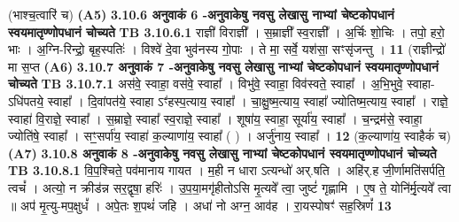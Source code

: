 \documentclass[17pt]{extarticle}
\begin{document}
{{{{{{{{{{{{{{{{{{{{{{                  \newline
                                    (भाश्च॒त्वारि॑ च) \textbf{(A5)} \newline \newline
                \textbf{ 3.10.6    अनुवाकं   6 -अनुवाकेषु नवसु लेखासु नाभ्यां चेष्टकोपधानं स्वयमातृण्णोपधानं चोच्यते} \newline
                                \textbf{ TB 3.10.6.1} \newline
                  राज्ञी॑ विराज्ञी᳚ । स॒म्राज्ञी᳚ स्व॒राज्ञी᳚ । अ॒र्चिः शो॒चिः । तपो॒ हरो॒ भाः । अ॒ग्नि-रिन्द्रो॒ बृह॒स्पतिः॑ । विश्वे॑ दे॒वा भुव॑नस्य गो॒पाः । ते मा॒ सर्वे॒ यश॑सा॒ सꣳसृ॑जन्तु । \textbf{ 11} \newline
                  \newline
                                    (राज्ञीन्द्रो॑ मा स॒प्त \textbf{(A6)} \newline \newline
                \textbf{ 3.10.7    अनुवाकं   7 -अनुवाकेषु नवसु लेखासु नाभ्यां चेष्टकोपधानं स्वयमातृण्णोपधानं चोच्यते} \newline
                                \textbf{ TB 3.10.7.1} \newline
                  अस॑वे॒ स्वाहा॒ वस॑वे॒ स्वाहा᳚ । विभु॑वे॒ स्वाहा॒ विव॑स्वते॒ स्वाहा᳚ । अ॒भि॒भुवे॒ स्वाहा-ऽधि॑पतये॒ स्वाहा᳚ । दि॒वांपत॑ये॒ स्वाहा ऽꣳ॑हस्प॒त्याय॒ स्वाहा᳚ । चा॒क्षु॒ष्म॒त्याय॒ स्वाहा᳚ ज्योतिष्म॒त्याय॒ स्वाहा᳚ । राज्ञे॒ स्वाहा॑ वि॒राज्ञे॒ स्वाहा᳚ । स॒म्राज्ञे॒ स्वाहा᳚ स्व॒राज्ञे॒ स्वाहा᳚ । शूषा॑य॒ स्वाहा॒ सूर्या॑य॒ स्वाहा᳚ । च॒न्द्रम॑से॒ स्वाहा॒ ज्योति॑षे॒ स्वाहा᳚ । सꣳ॒॒सर्पा॑य॒ स्वाहा॑ क॒ल्याणा॑य॒ स्वाहा᳚ ( ) । अर्जु॑नाय॒ स्वाहा᳚ । \textbf{ 12} \newline
                  \newline
                                    (क॒ल्याणा॑य॒ स्वाहैकं॑ च) \textbf{(A7)} \newline \newline
                \textbf{ 3.10.8    अनुवाकं   8 -अनुवाकेषु नवसु लेखासु नाभ्यां चेष्टकोपधानं स्वयमातृण्णोपधानं चोच्यते} \newline
                                \textbf{ TB 3.10.8.1} \newline
                  वि॒प॒श्चिते॒ पव॑मानाय गायत । म॒ही न धारा ऽत्यन्धो॑ अर्.षति । अहि॑र्.ह जी॒र्णामति॑सर्पति॒ त्वचं᳚ । अत्यो॒ न क्रीड॑न्न सर॒द्वृषा॒ हरिः॑ । उ॒प॒या॒मगृ॑हीतोऽसि मृ॒त्यवे᳚ त्वा॒ जुष्टं॑ गृह्णामि । ए॒ष ते॒ योनि॑र्मृ॒त्यवे᳚ त्वा ॥ अप॑ मृ॒त्यु-मप॒क्षुधं᳚ । अपे॒तः श॒पथं॑ जहि । अधा॑ नो अग्न॒ आव॑ह । रा॒यस्पोषꣳ॑ सह॒स्रिणं᳚ \textbf{ 13} \newline
}}}}}}}}}}}}}}}}}}}}}}
\end{document}
